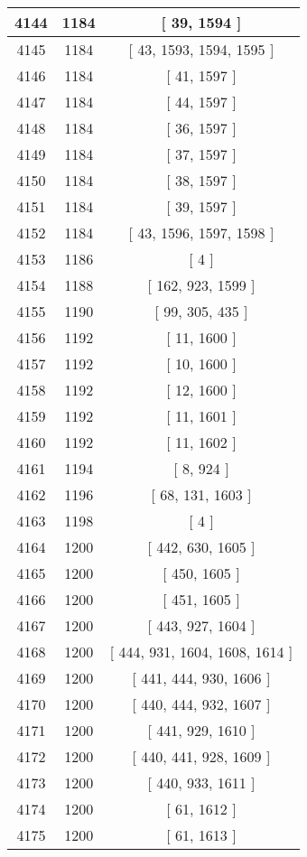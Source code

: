 \begin{center}
\begin{longtable}[H]{|| c c c ||}
\hline
4144 & 1184 & [ 39, 1594 ] \\ 
\hline
4145 & 1184 & [ 43, 1593, 1594, 1595 ] \\ 
\hline
4146 & 1184 & [ 41, 1597 ] \\ 
\hline
4147 & 1184 & [ 44, 1597 ] \\ 
\hline
4148 & 1184 & [ 36, 1597 ] \\ 
\hline
4149 & 1184 & [ 37, 1597 ] \\ 
\hline
4150 & 1184 & [ 38, 1597 ] \\ 
\hline
4151 & 1184 & [ 39, 1597 ] \\ 
\hline
4152 & 1184 & [ 43, 1596, 1597, 1598 ] \\ 
\hline
4153 & 1186 & [ 4 ] \\ 
\hline
4154 & 1188 & [ 162, 923, 1599 ] \\ 
\hline
4155 & 1190 & [ 99, 305, 435 ] \\ 
\hline
4156 & 1192 & [ 11, 1600 ] \\ 
\hline
4157 & 1192 & [ 10, 1600 ] \\ 
\hline
4158 & 1192 & [ 12, 1600 ] \\ 
\hline
4159 & 1192 & [ 11, 1601 ] \\ 
\hline
4160 & 1192 & [ 11, 1602 ] \\ 
\hline
4161 & 1194 & [ 8, 924 ] \\ 
\hline
4162 & 1196 & [ 68, 131, 1603 ] \\ 
\hline
4163 & 1198 & [ 4 ] \\ 
\hline
4164 & 1200 & [ 442, 630, 1605 ] \\ 
\hline
4165 & 1200 & [ 450, 1605 ] \\ 
\hline
4166 & 1200 & [ 451, 1605 ] \\ 
\hline
4167 & 1200 & [ 443, 927, 1604 ] \\ 
\hline
4168 & 1200 & [ 444, 931, 1604, 1608, 1614 ] \\ 
\hline
4169 & 1200 & [ 441, 444, 930, 1606 ] \\ 
\hline
4170 & 1200 & [ 440, 444, 932, 1607 ] \\ 
\hline
4171 & 1200 & [ 441, 929, 1610 ] \\ 
\hline
4172 & 1200 & [ 440, 441, 928, 1609 ] \\ 
\hline
4173 & 1200 & [ 440, 933, 1611 ] \\ 
\hline
4174 & 1200 & [ 61, 1612 ] \\ 
\hline
4175 & 1200 & [ 61, 1613 ] \\ 
\hline

\end{longtable}
\end{center}
